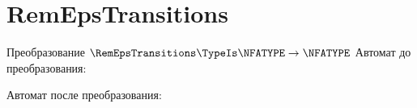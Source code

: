 \section{RemEpsTransitions}
\begin{frame}{Преобразование $\RemEpsTransitions\TypeIs\NFATYPE\to\NFATYPE$}
	Автомат до преобразования:


	Автомат после преобразования:


\end{frame}